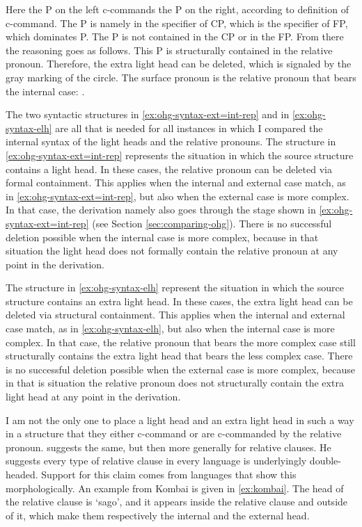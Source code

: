 Here the P on the left c-commands the P on the right, according to  definition of c-command.
The P is namely in the specifier of CP, which is the specifier of FP, which dominates P. The P is not contained in the CP or in the FP.
From there the reasoning goes as follows.
This P is structurally contained in the relative pronoun. Therefore, the extra light head can be deleted, which is signaled by the gray marking of the circle.
The surface pronoun is the relative pronoun that bears the internal case: .

The two syntactic structures in \ref{ex:ohg-syntax-ext=int-rep} and in \ref{ex:ohg-syntax-elh} are all that is needed for all instances in which I compared the internal syntax of the light heads and the relative pronouns.
The structure in \ref{ex:ohg-syntax-ext=int-rep} represents the situation in which the source structure contains a light head. In these cases, the relative pronoun can be deleted via formal containment.
This applies when the internal and external case match, as in \ref{ex:ohg-syntax-ext=int-rep}, but also when the external case is more complex.
In that case, the derivation namely also goes through the stage shown in \ref{ex:ohg-syntax-ext=int-rep} (see Section \ref{sec:comparing-ohg}).
There is no successful deletion possible when the internal case is more complex, because in that situation the light head does not formally contain the relative pronoun at any point in the derivation.

The structure in \ref{ex:ohg-syntax-elh} represent the situation in which the source structure contains an extra light head. In these cases, the extra light head can be deleted via structural containment.
This applies when the internal and external case match, as in \ref{ex:ohg-syntax-elh}, but also when the internal case is more complex.
In that case, the relative pronoun that bears the more complex case still structurally contains the extra light head that bears the less complex case.
There is no successful deletion possible when the external case is more complex, because in that is situation the relative pronoun does not structurally contain the extra light head at any point in the derivation.

I am not the only one to place a light head and an extra light head in such a way in a structure that they either c-command or are c-commanded by the relative pronoun. \citet{cinqueforthcoming} suggests the same, but then more generally for relative clauses. He suggests every type of relative clause in every language is underlyingly double-headed. Support for this claim comes from languages that show this morphologically. An example from Kombai is given in \ref{ex:kombai}. The head of the relative clause is  `sago', and it appears inside the relative clause and outside of it, which make them respectively the internal and the external head.

